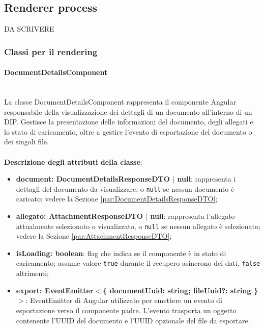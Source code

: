 \documentclass[a4paper,12pt]{article}
\begin{document}
{{        \subsection{Renderer process} {
            DA SCRIVERE

            \subsubsection{Classi per il rendering}{
                \paragraph{DocumentDetailsComponent}\label{par:DocumentDetailsComponent}\mbox{}\\
                La classe DocumentDetailsComponent rappresenta il componente Angular responsabile della visualizzazione dei dettagli di un documento all'interno di un DIP. Gestisce la presentazione delle informazioni del documento, degli allegati e lo stato di caricamento, oltre a gestire l'evento di esportazione del documento o dei singoli file.\\
                \\
                \textbf{Descrizione degli attributi della classe}:
                \begin{itemize}
                    \item \textbf{document: DocumentDetailsResponseDTO $|$ null}: rappresenta i dettagli del documento da visualizzare, o \texttt{null} se nessun documento è caricato; vedere la Sezione \ref{par:DocumentDetailsResponseDTO};
                    \item \textbf{allegato: AttachmentResponseDTO $|$ null}: rappresenta l'allegato attualmente selezionato o visualizzato, o \texttt{null} se nessun allegato è selezionato; vedere la Sezione \ref{par:AttachmentResponseDTO};
                    \item \textbf{isLoading: boolean}: flag che indica se il componente è in stato di caricamento; assume valore \texttt{true} durante il recupero asincrono dei dati, \texttt{false} altrimenti;
                    \item \textbf{export: EventEmitter$<$\{ documentUuid: string; fileUuid?: string \}$>$}: EventEmitter di Angular utilizzato per emettere un evento di esportazione verso il componente padre. L'evento trasporta un oggetto contenente l'UUID del documento e l'UUID opzionale del file da esportare.
                \end{itemize}
                
}}}}
\end{document}
